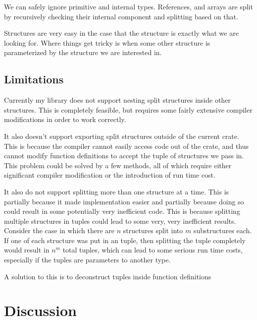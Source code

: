 \documentclass[12pt,oneside]{book}
\begin{document}
We can safely ignore primitive and internal types. References, and
arrays are split by recursively checking their internal component and splitting
based on that.


Structures are very easy in the case that the structure is exactly what we are
looking for. Where things get tricky is when some other structure is
parameterized by the structure we are interested in. 



\section{Limitations}
\label{sec:limits}
Currently my library does not support nesting split structures inside other structures.
This is completely feasible, but requires some fairly extensive compiler
modifications in order to work correctly.

It also doesn't support exporting split structures outside of the current crate.
This is because the compiler cannot easily access code out of the crate, and
thus cannot modify function definitions to accept the tuple of structures we
pass in. This problem could be solved by a few methods, all of which require
either significant compiler modification or the introduction of run
time cost. 

It also do not support splitting more than one structure at a time. This is
partially because it made implementation easier and partially because doing so
could result in some potentially very inefficient code. This is because
splitting multiple structures in tuples could lead to some very, very
inefficient results. Consider the case in which there are $n$ structures split
into $m$ substructures each. If one of each structure was put in an tuple, then
splitting the tuple completely would result in $n^m$ total tuples, which can lead
to some serious run time costs, especially if the tuples are parameters to
another type.

A solution to this is to deconstruct tuples inside function definitions

\chapter{Discussion}
\label{sec:discuss}
\end{document}
